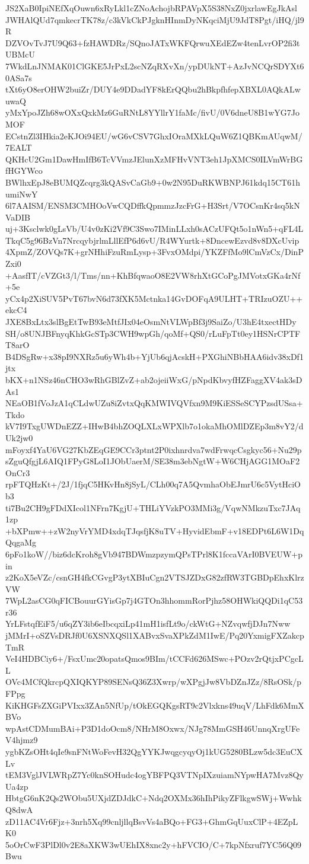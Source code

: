 JS2XaB0IpiNEfXqOuwn6xRyLkl1cZNoAchojbRPAVpX5S38NxZ0jxrlawEgJkAsl
JWHAlQUd7qmkecrTK78z/c3kVkCkPJgknHInmDyNKqciMjU9JdT8Pgt/iHQ/jl9R
DZVOvTvJ7U9Q63+fzHAWDRz/SQnoJATxWKFQrwuXEdEZw4tenLvrOP2fi3tUBMcU
7WkdLnJNMAK01ClGKE5JrPxL2scNZqRXvXn/ypDUkNT+AzJvNCQrSDYXt60ASa7s
tXt6yO8erOHW2buiZr/DUY4e9DDadYF8kErQQbu2hBkpfhfepXBXL0AQkALwuwaQ
yMxYpoJZh68wOXxQxkMz6GuRNtL8YYllrY1faMc/fivU/0V6dneU8B1wYG7JoMOF
ECstnZl3IHkia2eKJOi94EU/wG6vCSV7GhxIOraMXkLQuW6Z1QBKmAUqwM/7EALT
QKHcU2Gm1DawHmIfB6TcVVmzJElunXzMFHvVNT3eh1JpXMCS0ILVmWrBGfHGYWco
BWlhxEpJ8eBUMQZcqrg3kQASvCaGb9+0w2N95DuRKWBNPJ61kdq15CT61humiNwY
6l7AAISM/ENSM3CMHOoVwCQDffkQpmmzJzcFrG+H3Srt/V7OCsnKr4sq5kNVaDIB
uj+3Ksclwk0gLsVb/U4v0zKi2Vf9C3Swo7IMinLLxh0sACzUFQt5o1nWn5+qFL4L
TkqC5g96BzVn7NrcqybjrlmLllEfP6d6vU/R4WYurtk+8DncewEzvd8v8DXcUvip
4XpmZ/ZOVQs7K+grNHhiFzuRmLysp+3FvxOMdpi/YKZFfMo9lCmVzCx/DinPZxi0
+AasfIT/cVZGt3/l/Tms/nn+KhBfqwaoO8E2VW8rhXtGCoPgJMVotxGKa4rNf+5e
yCx4p2XiSUV5PvT67bvN6d73fXK5Mctnka14GvDOFqA9ULHT+TRIzuOZU++ekcC4
JXE8BxLtx3slBgEtTwB93eMtfJIx04eOsmNtVLWpBf3j9SaiZo/U3hE4txectHDy
SH/o8UNJBFnyqKhkGcSTp3CWH9wpGh/qoMf+QS0/rLuFpTt0ey1HSNrCPTFT8arO
B4DSgRw+x38pI9NXRz5u6yWh4b+YjUb6qjAcskH+PXGhiNBbHAA6idv38xDf1jtx
bKX+n1NSz46nCHO3wRhGBlZvZ+ab2ojeiiWxG/pNpdKbvyfHZFaggXV4ak3sDAs1
NEaOB1fVoJzA1qCLdwUZu8iZvtxQqKMWIVQVfxn9M9KiESSeSCYPzsdUSsa+Tkdo
kV7I9TxgUWDnEZZ+IHwB4bhZOQLXLxWPXlb7o1okaMhOMlDZEp3m8vY2/dUk2jw0
mFoyxf4YaU6VG27KbZEqGE9CCr3ptnt2P0ixhnrdva7wdFrwqcCsgkyc56+Nu29p
sZguQfgjL6AIQ1FPyG8LoI1JObUaerM/SE38m3ebNgtW+W6CHjAGG1MOaF2OnCr3
rpFTQHzKt+/2J/1fjqC5HKvHn8jSyL/CLh00q7A5QvmhaObEJmrU6c5VytHciOb3
ti7Bu2CH9gFDdXIcol1NFrn7KgjU+THLiYVzkPO3MMi3g/VqwNMkzuTxc7JAq1zp
+bXPmw++zW2nyVrYMD4xdqTJqsfjK8uTV+HyvidEbmF+v18EDPt6L6W1DqQqgaMg
6pFo1koW//biz6dcKroh8gVb947BDWmzpzymQPsTPrl8K1fccaVArI0BVEUW+pin
z2KoX5eVZc/csnGH4fkCGvgP3ytXBIuCgn2VTSJZDxG82zfRW3TGBDpEhxKlrzVW
7WpL2asCG0qFICBouurGYisGp7j4GTOn3hhommRorPjhz58OHWkiQQDi1qC53r36
YrLFstqfEiF5/u6qZY3ib6eIbcqxiLp41mH1isfLt9o/ckWtG+NZvqwfjDJn7Nww
jMMrI+oSZVsDRJf0U6XSNXQSl1XABvxSvaXPkZdM1IwE/Pq20YxmigFXZakcpTmR
VeI4HDBCiy6+/FsxUmc20opatsQmos9BIm/tCCFd626MSwc+POzv2rQtjxPCgcLL
OVc4MCfQkrcpQXIQKYP89SENsQ36Z3Xwrp/wXPgjJw8VbDZnJZz/8RsOSk/pFPpg
KiKHGFsZXGiPVIxx3ZAn5NfUp/tOkEGQKgsRT9c2Vlxkns49uqV/LhFdk6MmXBVo
wpAstCDMumBAi+P3D1doOcm8/NHrM8Oxwx/NJg78MmGSH46UnnqXrgUFeV4hjmz9
ygbKZsOHt4qIe9snFNtWoFevH32QgYYKJwqgcyqyOj1kUG5280BLzw5dc3EuCXLv
tEM3VglJVLWRpZ7Yc0knSOHudc4ogYBFPQ3VTNpIXzuiamNYpwHA7Mvz8QyUa4zp
HbtgG6nK2Qs2WObu5UXjdZDJdkC+Ndq2OXMx36hIhPikyZFlkgwSWj+WwhkQ8dwA
zD11AC4Vr6Fjz+3nrh5Xq99cnljllqBsvVs4aBQo+FG3+GhmGqUuxClP+4EZpLK0
5oOrCwF3PlDl0v2E8aXKW3wUEhIX8xnc2y+hFVCIO/C+7kpNfxruf7YC56Q09Bwu
